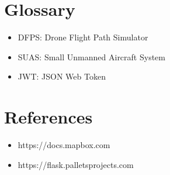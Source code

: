 \documentclass[12pt]{article}
\begin{document}
\section{Glossary}
\begin{itemize}
  \item DFPS: Drone Flight Path Simulator
  \item SUAS: Small Unmanned Aircraft System
  \item JWT: JSON Web Token
\end{itemize}

\section{References}
\begin{itemize}
  \item https://docs.mapbox.com
  \item https://flask.palletsprojects.com
\end{itemize}
\end{document}
